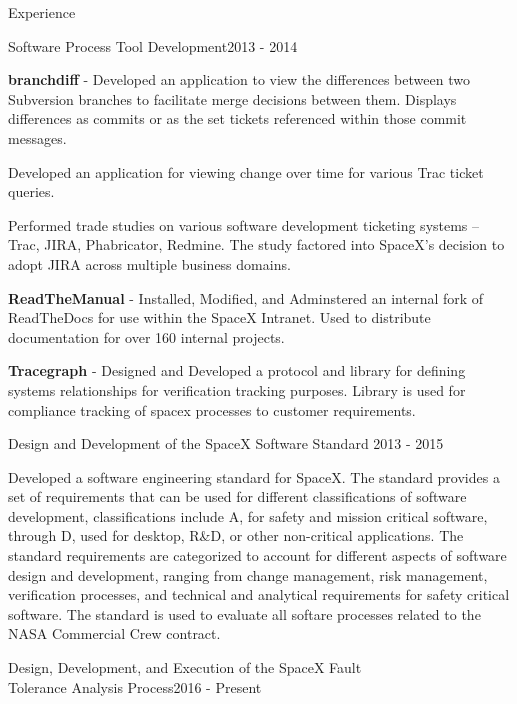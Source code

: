 \documentclass{resume} %
\begin{document}
\begin{rSection}{Experience}
\begin{rSubsection}{Software Process Tool Development}{2013 - 2014}{}{}
\item \textbf{branchdiff} - Developed an application to view the differences
  between two Subversion branches to facilitate merge decisions
  between them. Displays differences as commits or as the set tickets
  referenced within those commit messages.
\item Developed an application for viewing change over time for various Trac
  ticket queries.
\item Performed trade studies on various software development ticketing systems
  -- Trac, JIRA, Phabricator, Redmine. The study factored into
  SpaceX's decision to adopt JIRA across multiple business domains.
\item \textbf{ReadTheManual} - Installed, Modified, and Adminstered an internal
  fork of ReadTheDocs for use within the SpaceX Intranet. Used to
  distribute documentation for over 160 internal projects.
\item \textbf{Tracegraph} - Designed and Developed a protocol and
  library for defining systems relationships for verification tracking
  purposes. Library is used for compliance tracking of spacex
  processes to customer requirements.

\end{rSubsection}




\begin{rSubsection}{Design and Development of the SpaceX Software
    Standard} {2013 - 2015}{}{}

\item Developed a software engineering standard for SpaceX. The
  standard provides a set of requirements that can be used for
  different classifications of software development, classifications
  include A, for safety and mission critical software, through D, used
  for desktop, R\&D, or other non-critical applications. The standard
  requirements are categorized to account for different aspects of
  software design and development, ranging from change management,
  risk management, verification processes, and technical and
  analytical requirements for safety critical software. The standard
  is used to evaluate all softare processes related to the NASA
  Commercial Crew contract.

\end{rSubsection}


\begin{rSubsection}{Design, Development, and Execution of the SpaceX Fault\\
    Tolerance Analysis Process}{2016 - Present}{}


\end{rSubsection}
\end{rSection}
\end{document}
